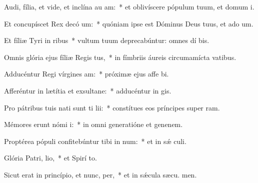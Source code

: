 \item Audi, fília, et vide, et inclína au am:~* et oblivíscere pópulum tuum, et domum  i.
\item Et concupíscet Rex decó um:~* quóniam ipse est Dóminus Deus tuus, et ado um.
\item Et fíliæ Tyri in ribus~* vultum tuum deprecabúntur: omnes dí bis.
\item Omnis glória ejus fíliæ Regis  tus,~* in fímbriis áureis circumamícta vatibus.
\item Adducéntur Regi vírgines  am:~* próximæ ejus affe bi.
\item Afferéntur in lætítia et exsultane:~* adducéntur in  gis.
\item Pro pátribus tuis nati sunt ti lii:~* constítues eos príncipes super  ram.
\item Mémores erunt nómi i:~* in omni generatióne et genenem.
\item Proptérea pópuli confitebúntur tibi in num:~* et in sǽ culi.
\item Glória Patri,  lio,~* et Spirí to.
\item Sicut erat in princípio, et nunc,  per,~* et in sǽcula sæcu. men.
